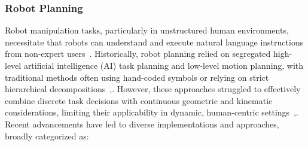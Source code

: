 \documentclass[12pt]{extarticle}
\begin{document}
\subsubsection{Robot Planning}

Robot manipulation tasks, particularly in unstructured human environments, necessitate that robots can understand and execute natural language instructions from non-expert users~\cite{cliport}. Historically, robot planning relied on segregated high-level artificial intelligence (AI) task planning and low-level motion planning, with traditional methods often using hand-coded symbols or relying on strict hierarchical decompositions~\cite{learning-neuro-symbolic},\cite{code-as-symbolic-planner}. However, these approaches struggled to effectively combine discrete task decisions with continuous geometric and kinematic considerations, limiting their applicability in dynamic, human-centric settings~\cite{cliport},\cite{code-as-symbolic-planner}.
Recent advancements have led to diverse implementations and approaches, broadly categorized as:
\end{document}
